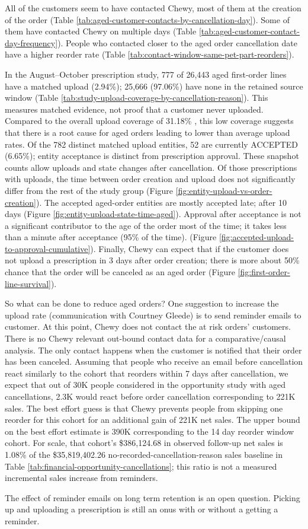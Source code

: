 All of the customers seem to have contacted Chewy, most of them at the
creation of the order (Table
\ref{tab:aged-customer-contacts-by-cancellation-day}). Some of them
have contacted Chewy on multiple days (Table
\ref{tab:aged-customer-contact-day-frequency}). People who
contacted closer to the aged order cancellation date have a higher
reorder rate (Table \ref{tab:contact-window-same-pet-part-reorders}).

In the August--October prescription study, 777 of 26,443 aged
first-order lines have a matched upload (2.94\%); 25,666 (97.06\%)
have none in the retained source window (Table
\ref{tab:study-upload-coverage-by-cancellation-reason}).  This
measures matched evidence, not proof that a customer never uploaded.
Compared to the overall upload coverage of 31.18\% , this low coverage
suggests that there is a root cause for aged orders leading to lower
than average upload rates.  Of the 782 distinct matched upload
entities, 52 are currently ACCEPTED (6.65\%); entity acceptance is
distinct from prescription approval.  These snapshot counts allow
uploads and state changes after cancellation.  Of those prescriptions
with uploads, the time between order creation and upload does not
significantly differ from the rest of the study group (Figure
\ref{fig:entity-upload-vs-order-creation}). The accepted aged-order
entities are mostly accepted late; after 10 days (Figure
\ref{fig:entity-upload-state-time-aged}). Approval after acceptance is
not a significant contributor to the age of the order most of the
time; it takes less than a minute after acceptance (95\% of the
time). (Figure
\ref{fig:accepted-upload-to-approval-cumulative}). Finally, Chewy can
expect that if the customer does not upload a prescription in 3 days
after order creation; there is more about 50\% chance that the order
will be canceled as an aged order (Figure
\ref{fig:first-order-line-survival}).

So what can be done to reduce aged orders?  One suggestion to increase
the upload rate (communication with Courtney Gleede) is to send
reminder emails to customer. At this point, Chewy does not contact the
at risk orders' customers. There is no Chewy relevant out-bound
contact data for a comparative/causal analysis. The only contact
happens when the customer is notified that their order has been
canceled.  Assuming that people who receive an email before
cancellation react similarly to the cohort that reorders within 7 days
after cancellation, we expect that out of 30K people considered in the
opportunity study with aged cancellations, 2.3K would react before
order cancellation corresponding to 221K sales. The best effort guess
is that Chewy prevents people from skipping one reorder for this
cohort for an additional gain of 221K net sales.  The upper bound on
the best effort estimate is 390K corresponding to the 14 day reorder
window cohort. For scale, that cohort's \$386,124.68 in observed
follow-up net sales is 1.08\% of the \$35,819,402.26 no-recorded-cancellation-reason
sales baseline in Table \ref{tab:financial-opportunity-cancellations};
this ratio is not a measured incremental sales increase from reminders.

The effect of reminder emails on long term retention is an open
question. Picking up and uploading a prescription is
still an onus with or without a getting a reminder.

